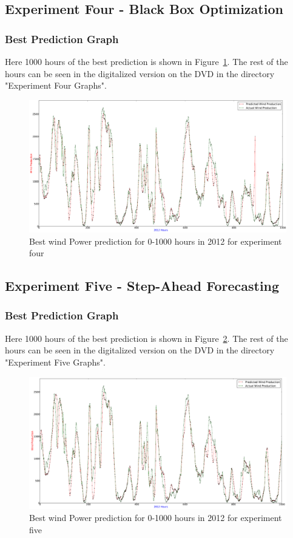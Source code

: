 \newpage
\subsection{Experiment Four - Black Box Optimization}

\subsubsection{Best Prediction Graph}
Here 1000 hours of the best prediction is shown in Figure~\ref{fig:experimentFourInput}. The rest of the hours can be seen in the digitalized version on the DVD in the directory "Experiment Four Graphs".

\begin{figure}
\centering
\includegraphics[width=0.99\linewidth]{billeder/experimentFourInput.png}
\caption{Best wind Power prediction for 0-1000 hours in 2012 for experiment four}
\label{fig:experimentFourInput}
\end{figure} 

\newpage
\subsection{Experiment Five - Step-Ahead Forecasting}

\subsubsection{Best Prediction Graph}
Here 1000 hours of the best prediction is shown in Figure~\ref{fig:experimentFiveInput}. The rest of the hours can be seen in the digitalized version on the DVD in the directory "Experiment Five Graphs".

\begin{figure}
\centering
\includegraphics[width=0.99\linewidth]{billeder/experimentFiveInput.png}
\caption{Best wind Power prediction for 0-1000 hours in 2012 for experiment five}
\label{fig:experimentFiveInput}
\end{figure} 